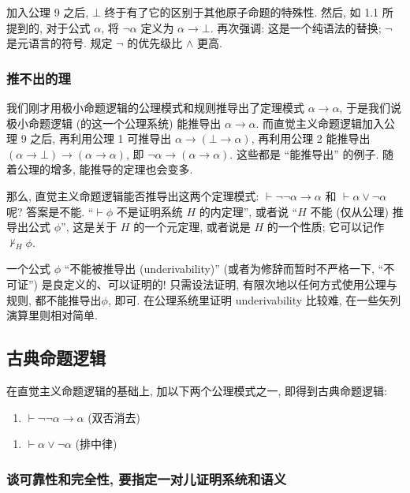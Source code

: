 \documentclass{article}
\def\a{\alpha}
\begin{document}
加入公理 9 之后, $\bot$ 终于有了它的区别于其他原子命题的特殊性. 然后, 如 1.1 所提到的, 对于公式 $\a$, 将 $\neg \a$ 定义为 $\a \to \bot$. 再次强调: 这是一个纯语法的替换; $\neg$ 是元语言的符号. 规定 $\neg$ 的优先级比 $\land$ 更高.


\subsubsection{推不出的理}

我们刚才用极小命题逻辑的公理模式和规则推导出了定理模式 $\a \to \a$, 于是我们说极小命题逻辑 (的这一个公理系统) 能推导出 $\a \to \a$. 而直觉主义命题逻辑加入公理 9 之后, 再利用公理 1 可推导出 $\a \to (\bot \to \a)$, 再利用公理 2 能推导出 $(\a \to \bot) \to (\a \to \a)$, 即 $\neg\a \to (\a \to \a)$. 这些都是 ``能推导出'' 的例子. 随着公理的增多, 能推导的定理也会变多. 

那么, 直觉主义命题逻辑能否推导出这两个定理模式: $\vdash \neg \neg \a \to \a$ 和 $\vdash \a \lor \neg \a$ 呢? 答案是不能. ``$\vdash \phi$ 不是证明系统 $H$ 的内定理'', 或者说 ``$H$ 不能 (仅从公理) 推导出公式 $\phi$'', 这是关于 $H$ 的一个元定理, 或者说是 $H$ 的一个性质; 它可以记作 $\not\vdash_H \phi$. 

一个公式 $\phi$ ``不能被推导出 (underivability)'' (或者为修辞而暂时不严格一下, ``不可证'') 是良定义的、可以证明的! 只需设法证明, 有限次地以任何方式使用公理与规则, 都不能推导出$\phi$, 即可. 在公理系统里证明 underivability 比较难, 在一些矢列演算里则相对简单.

\subsection{古典命题逻辑}

在直觉主义命题逻辑的基础上, 加以下两个公理模式之一, 即得到古典命题逻辑:
\begin{enumerate}[start=10]
\item $\vdash \neg \neg \a \to \a$ (双否消去)
\end{enumerate}
\begin{enumerate}[start=10]
\item $\vdash \a \lor \neg \a$ (排中律)
\end{enumerate}

\subsubsection{谈可靠性和完全性, 要指定一对儿证明系统和语义}
\end{document}
